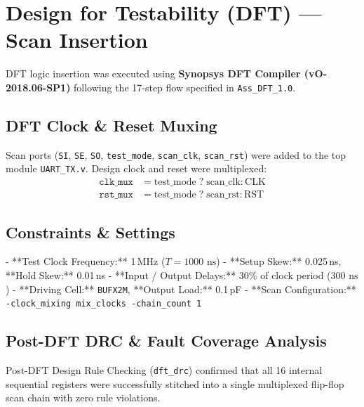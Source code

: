 \documentclass[12pt,a4paper]{article}
\begin{document}
\section{Design for Testability (DFT) — Scan Insertion}

DFT logic insertion was executed using \textbf{Synopsys DFT Compiler (vO-2018.06-SP1)} following the 17-step flow specified in \texttt{Ass\_DFT\_1.0}.

\subsection{DFT Clock \& Reset Muxing}
Scan ports (\texttt{SI}, \texttt{SE}, \texttt{SO}, \texttt{test\_mode}, \texttt{scan\_clk}, \texttt{scan\_rst}) were added to the top module \texttt{UART\_TX.v}. Design clock and reset were multiplexed:
\begin{align}
\texttt{clk\_mux} &= \text{test\_mode} \;?\; \text{scan\_clk} : \text{CLK} \\
\texttt{rst\_mux} &= \text{test\_mode} \;?\; \text{scan\_rst} : \text{RST}
\end{align}

\subsection{Constraints \& Settings}
- **Test Clock Frequency:** 1\,MHz ($T = 1000\text{ ns}$)
- **Setup Skew:** 0.025\,ns, **Hold Skew:** 0.01\,ns
- **Input / Output Delays:** 30\% of clock period ($300\text{ ns}$)
- **Driving Cell:** \texttt{BUFX2M}, **Output Load:** 0.1\,pF
- **Scan Configuration:** \texttt{-clock\_mixing mix\_clocks -chain\_count 1}

\subsection{Post-DFT DRC \& Fault Coverage Analysis}

Post-DFT Design Rule Checking (\texttt{dft\_drc}) confirmed that all 16 internal sequential registers were successfully stitched into a single multiplexed flip-flop scan chain with zero rule violations.
\end{document}
